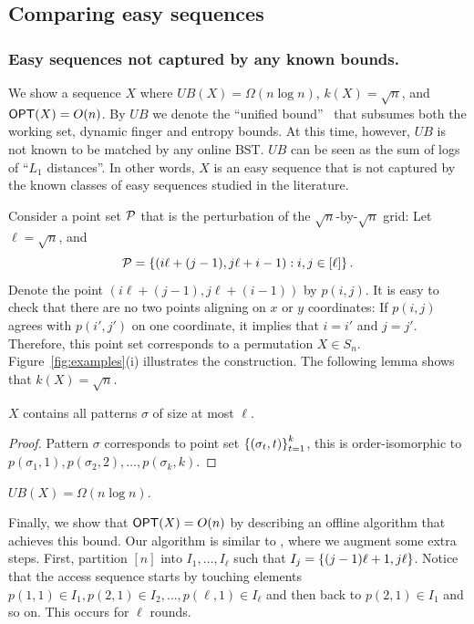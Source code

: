 \subsection{Comparing easy sequences}
\label{sec:comparisons}

\subsubsection*{Easy sequences not captured by any known bounds.}
\label{sec:easy-examples}
We show a sequence $X$ where $UB(X) = \Omega(n \log n)$, $k(X) = \sqrt{n}$, and $\mbox{\sf OPT}(X) = O(n)$. By $UB$ we denote the ``unified bound''~\cite{unified} that subsumes both the working set, dynamic finger and entropy bounds. At this time, however, $UB$ is not known to be matched by any online BST. $UB$ can be seen as the sum of logs of ``$L_1$ distances''. In other words, $X$ is an easy sequence that is not captured by the known classes of easy sequences studied in the literature.  

Consider a point set ${\mathcal{P}}$ that is the perturbation of the $\sqrt{n}$-by-$\sqrt{n}$ grid: Let $\ell = \sqrt{n}$, and  
\[{\mathcal{P}} = \left\{ (i \ell + (j-1), j \ell + i-1): i,j \in [\ell]  \right\}.\]
Denote the point $(i\ell+(j-1), j \ell +(i-1))$ by $p(i,j)$.  
It is easy to check that there are no two points aligning on $x$ or $y$ coordinates: If $p(i,j)$ agrees with $p(i',j')$ on one coordinate, it implies that $i= i'$ and $j=j'$.   
Therefore, this point set corresponds to a permutation $X \in S_n$. 
Figure~\ref{fig:examples}(i) illustrates the construction. The following lemma shows that $k(X) = \sqrt{n}$. 

\begin{lemma} 
$X$ contains all patterns $\sigma$ of size at most $\ell$. 
\end{lemma} 
\begin{proof} 
Pattern $\sigma$ corresponds to point set $\left\{ (\sigma_t, t) \right\}_{t=1}^{k}$, this is order-isomorphic to $p(\sigma_1, 1), p(\sigma_2,2),\ldots, p(\sigma_k, k)$.
\end{proof} 


\begin{proposition} 
$UB(X) = \Omega(n \log n)$. 
\end{proposition} 


Finally, we show that $\mbox{\sf OPT}(X) = O(n)$ by describing an offline algorithm that achieves this bound.
Our algorithm is similar to \greedy, where we augment some extra steps.
First, partition $[n]$ into $I_1,\ldots, I_{\ell}$ such that $I_j = \left\{ (j-1)\ell +1, j \ell \right\}$. 
Notice that the access sequence starts by touching elements $p(1,1) \in I_1,p(2,1) \in I_2, \ldots, p(\ell,1) \in I_{\ell}$ and then back to $p(2,1)\in I_1$ and so on. 
This occurs for $\ell$ rounds.    

